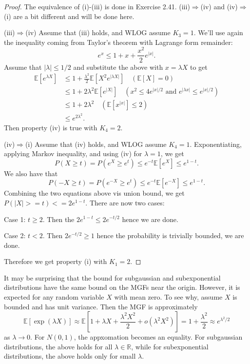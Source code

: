 \begin{proof}
The equivalence of (i)-(iii) is done in Exercise 2.41. (iii)$\Rightarrow$(iv) and (iv)$\Rightarrow$(i) 
are a bit different and will be done here.

(iii)$\Rightarrow$(iv) Assume that (iii) holds, and WLOG assume $K_3 = 1$. We'll use again the 
inequality coming from Taylor's theorem with Lagrange form remainder: 
\[ e^x \leq 1 + x + \frac{x^2}{2}e^{|x|}. \]
Assume that $|\lambda| \leq 1/2$ and substitute the above with $x = \lambda X$ to get 
\begin{align*}
	\mathbb{E}[e^{\lambda X}] 
	&\leq 1 + \frac{\lambda^2}{2}\mathbb{E}[X^2 e^{|\lambda X|}] \quad (\mathbb{E}[X] = 0) \\
	&\leq 1 + 2 \lambda^2 \mathbb{E}[e^{|X|}] \quad (x^2 \leq 4e^{|x| / 2} \text{ and } 
	e^{|\lambda x|} \leq e^{|x| / 2}) \\
	&\leq 1 + 2 \lambda^2 \quad (\mathbb{E}[x^{|x|}] \leq 2) \\
	&\leq e^{2 \lambda^2}.
\end{align*}
Then property (iv) is true with $K_4 = 2$.

(iv)$\Rightarrow$(i) Assume that (iv) holds, and WLOG assume $K_4 = 1$. Exponentiating, applying Markov 
inequality, and using (iv) for $\lambda =1$, we get 
\[ P(X \geq t) = P(e^X \geq e^t) \leq e^{-t}\mathbb{E}[e^X] \leq e^{1 - t}. \]
We also have that 
\[ P(-X \geq t) = P(e^{-X} \geq e^t) \leq e^{-t}\mathbb{E}[e^{-X}] \leq e^{1 - t}. \]
Combining the two equations above vis union bound, we get $P(|X| >= t) <= 2e^{1 - t}$. There are now 
two cases: 

Case 1: $t \geq 2$. Then the $2e^{1 - t} \leq 2e^{-t / 2}$ hence we are done.

Case 2: $t < 2$. Then $2e^{-t / 2} \geq 1$ hence the probability is trivially bounded, we are done.

Therefore we get property (i) with $K_1 = 2$.
\end{proof}

\begin{remark}
\label{rmk:2.8.2}
It may be surprising that the bound for subgaussian and subexponential distributions have the same 
bound on the MGFs near the origin. However, it is expected for any random variable $X$ with mean zero. 
To see why, assume $X$ is bounded and has unit variance. Then the MGF is approximately 
\[ \mathbb{E}[\exp{(\lambda X)}] 
\approx \mathbb{E}\left[ 1 + \lambda X + \frac{\lambda^2 X^2}{2} + o(\lambda^2 X^2) \right] 
= 1 + \frac{\lambda^2}{2} \approx e^{\lambda^2 / 2} \]
as $\lambda \to 0$. For $N(0, 1)$, the appxomation becomes an equality. For subgaussian distributions, 
the above holds for all $\lambda \in \mathbb{R}$, while for subexponential distributions, the above 
holds only for small $\lambda$.
\end{remark}


